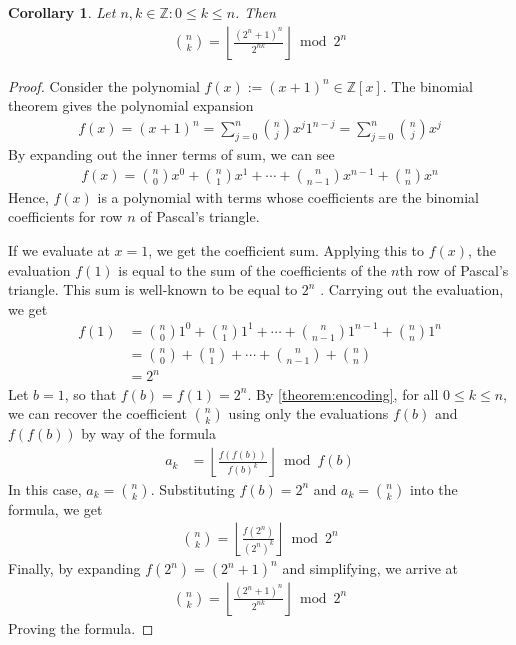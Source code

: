 \documentclass[11pt,reqno]{article}
\theoremstyle{plain}
\newtheorem{corollary}[theorem]{Corollary}
\theoremstyle{definition}
\newcommand{\floor}[1]{\left\lfloor #1 \right\rfloor}
\begin{document}
\begin{corollary} \label{corollary:binomialcoefficients}
Let $n,k \in \mathbb{Z} : 0 \leq k \leq n$. Then
\begin{align*}
\binom{n}{k} = \floor{\frac{(2^n+1)^n}{2^{n k}}} \bmod{2^n}
\end{align*}
\end{corollary}
\begin{proof}
Consider the polynomial $f(x) := (x+1)^n \in \mathbb{Z}[x]$. The binomial theorem gives the polynomial expansion
\begin{align*}
    f(x) = (x+1)^n = \sum_{j=0}^n \binom{n}{j} x^j 1^{n-j} = \sum_{j=0}^n \binom{n}{j} x^j
\end{align*}
By expanding out the inner terms of sum, we can see
\begin{align*}
    f(x) = \binom{n}{0} x^0 + \binom{n}{1} x^1 + \cdots + \binom{n}{n-1} x^{n-1} + \binom{n}{n} x^{n} 
\end{align*}
Hence, $f(x)$ is a polynomial with terms whose coefficients are the binomial coefficients for row $n$ of Pascal's triangle. 

If we evaluate at $x=1$, we get the coefficient sum. Applying this to $f(x)$, the evaluation $f(1)$ is equal to the sum of the coefficients of the $n$th row of Pascal's triangle. This sum is well-known to be equal to $2^n$ \cite{A000079}. Carrying out the evaluation, we get
\begin{align*}
f(1) &= \binom{n}{0} 1^0 + \binom{n}{1} 1^1 + \cdots + \binom{n}{n-1} 1^{n-1} + \binom{n}{n} 1^{n} \\
&= \binom{n}{0} + \binom{n}{1} + \cdots + \binom{n}{n-1} + \binom{n}{n} \\
&= 2^n
\end{align*}
Let $b = 1$, so that $f(b) = f(1) = 2^n$. By \cref{theorem:encoding}, for all $0 \leq k \leq n$, we can recover the coefficient $\binom{n}{k}$ using only the evaluations $f(b)$ and $f(f(b))$ by way of the formula
\begin{align*}
    a_k &= \floor{\frac{f(f(b))}{f(b)^k}} \bmod{f(b)}
\end{align*}
In this case, $a_k = \binom{n}{k}$. Substituting $f(b) = 2^n$ and $a_k = \binom{n}{k}$ into the formula, we get
\begin{align*}
    \binom{n}{k} = \floor{\frac{f(2^n)}{(2^n)^k}} \bmod{2^n}
\end{align*}
Finally, by expanding $f(2^n) = (2^n+1)^n$ and simplifying, we arrive at
\begin{align*}
    \binom{n}{k} = \floor{\frac{(2^n+1)^n}{2^{nk}}} \bmod{2^n}
\end{align*}
Proving the formula.
\end{proof}
\end{document}
